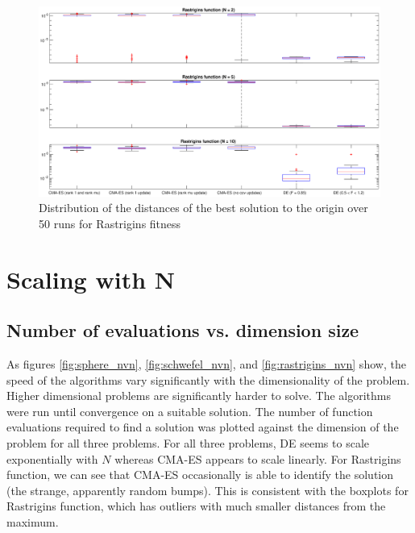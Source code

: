 \documentclass[12pt]{article}
\begin{document}
\begin{landscape}
\thispagestyle{empty}
    \begin{figure}
        \hspace*{-6cm}
        \includegraphics[width=1.5\linewidth]{pics/rastrigins_bplot.eps}
        \caption{Distribution of the distances of the best solution to the origin over 50 runs for Rastrigins fitness}
        \label{fig:rastrigins_bplot}
    \end{figure}
\end{landscape}

\section{Scaling with N}
\subsection{Number of evaluations vs. dimension size}
As figures \ref{fig:sphere_nvn}, \ref{fig:schwefel_nvn}, and \ref{fig:rastrigins_nvn} show, the speed of the algorithms vary significantly with the dimensionality of the problem. Higher dimensional problems are significantly harder to solve. The algorithms were run until convergence on a suitable solution. The number of function evaluations required to find a solution was plotted against the dimension of the problem for all three problems. For all three problems, DE seems to scale exponentially with $N$ whereas CMA-ES appears to scale linearly. For Rastrigins function, we can see that CMA-ES occasionally is able to identify the solution (the strange, apparently random bumps). This is consistent with the boxplots for Rastrigins function, which has outliers with much smaller distances from the maximum.
\end{document}
